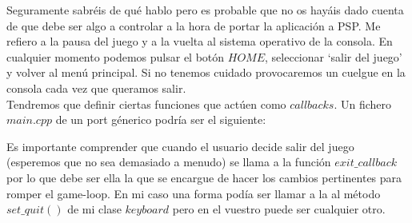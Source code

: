 Seguramente sabréis de qué hablo pero es probable que no os hayáis dado
cuenta de que debe ser algo a controlar a la hora de portar la aplicación
a PSP. Me refiero a la pausa del juego y a la vuelta al sistema operativo
de la consola. En cualquier momento podemos pulsar el botón $HOME$, seleccionar
`salir del juego' y volver al menú principal. Si no tenemos cuidado
provocaremos un cuelgue en la consola cada vez que queramos salir.\\

Tendremos que definir ciertas funciones que actúen como $callbacks$. Un fichero
$main.cpp$ de un port génerico podría ser el siguiente:



Es importante comprender que cuando el usuario decide salir del juego
(esperemos que no sea demasiado a menudo) se llama a la función
$exit\_callback$ por lo que debe ser ella la que se encargue de hacer
los cambios pertinentes para romper el game-loop. En mi caso una forma
podía ser llamar a la al método $set\_quit()$ de mi clase $keyboard$ pero
en el vuestro puede ser cualquier otro.

